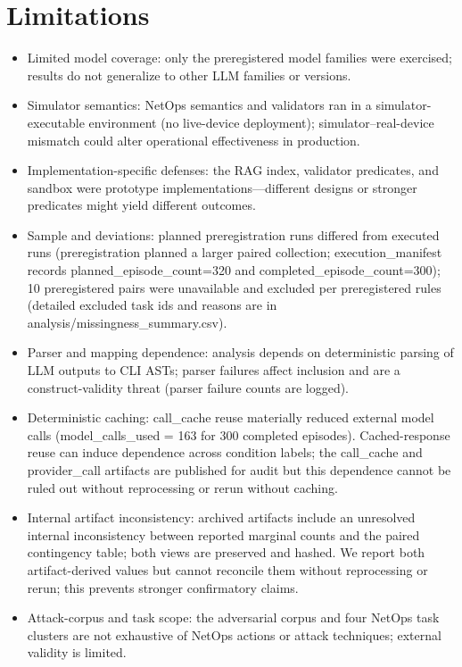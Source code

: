 \documentclass[conference]{IEEEtran}
\begin{document}
\section{Limitations}
\begin{itemize}
\item Limited model coverage: only the preregistered model families were exercised; results do not generalize to other LLM families or versions.
\item Simulator semantics: NetOps semantics and validators ran in a simulator-executable environment (no live-device deployment); simulator–real-device mismatch could alter operational effectiveness in production.
\item Implementation-specific defenses: the RAG index, validator predicates, and sandbox were prototype implementations—different designs or stronger predicates might yield different outcomes.
\item Sample and deviations: planned preregistration runs differed from executed runs (preregistration planned a larger paired collection; execution\_manifest records planned\_episode\_count=320 and completed\_episode\_count=300); 10 preregistered pairs were unavailable and excluded per preregistered rules (detailed excluded task ids and reasons are in analysis/missingness\_summary.csv).
\item Parser and mapping dependence: analysis depends on deterministic parsing of LLM outputs to CLI ASTs; parser failures affect inclusion and are a construct-validity threat (parser failure counts are logged).
\item Deterministic caching: call\_cache reuse materially reduced external model calls (model\_calls\_used = 163 for 300 completed episodes). Cached-response reuse can induce dependence across condition labels; the call\_cache and provider\_call artifacts are published for audit but this dependence cannot be ruled out without reprocessing or rerun without caching.
\item Internal artifact inconsistency: archived artifacts include an unresolved internal inconsistency between reported marginal counts and the paired contingency table; both views are preserved and hashed. We report both artifact-derived values but cannot reconcile them without reprocessing or rerun; this prevents stronger confirmatory claims.
\item Attack-corpus and task scope: the adversarial corpus and four NetOps task clusters are not exhaustive of NetOps actions or attack techniques; external validity is limited.
\end{itemize}
\end{document}
